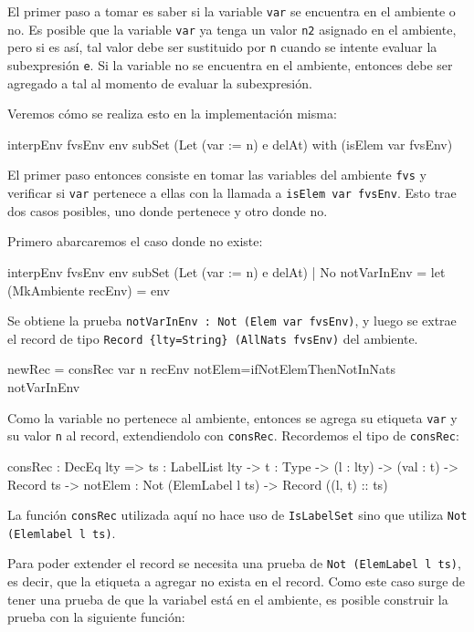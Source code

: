 El primer paso a tomar es saber si la variable \texttt{var} se encuentra en el ambiente o no. Es posible que la variable \texttt{var} ya tenga un valor \texttt{n2} asignado en el ambiente, pero si es así, tal valor debe ser sustituido por \texttt{n} cuando se intente evaluar la subexpresión \texttt{e}. Si la variable no se encuentra en el ambiente, entonces debe ser agregado a tal al momento de evaluar la subexpresión.

Veremos cómo se realiza esto en la implementación misma:

\begin{code}
interpEnv {fvsEnv} env subSet (Let (var := n) e delAt)
    with (isElem var fvsEnv)
\end{code}

El primer paso entonces consiste en tomar las variables del ambiente \texttt{fvs} y verificar si \texttt{var} pertenece a ellas con la llamada a \texttt{isElem var fvsEnv}. Esto trae dos casos posibles, uno donde pertenece y otro donde no.

Primero abarcaremos el caso donde no existe:

\begin{code}
interpEnv {fvsEnv} env subSet (Let (var := n) e delAt)
  | No notVarInEnv =
  let (MkAmbiente recEnv) = env
\end{code}

Se obtiene la prueba \texttt{notVarInEnv : Not (Elem var fvsEnv)}, y luego se extrae el record de tipo \texttt{Record \{lty=String\} (AllNats fvsEnv)} del ambiente.

\begin{code}
newRec = consRec var n recEnv
  {notElem=ifNotElemThenNotInNats notVarInEnv}
\end{code}

Como la variable no pertenece al ambiente, entonces se agrega su etiqueta \texttt{var} y su valor \texttt{n} al record, extendiendolo con \texttt{consRec}. Recordemos el tipo de \texttt{consRec}:

\begin{code}
consRec : DecEq lty => {ts : LabelList lty} -> {t : Type} ->
  (l : lty) -> (val : t) -> Record ts ->
  {notElem : Not (ElemLabel l ts)} -> Record ((l, t) :: ts)
\end{code}

La función \texttt{consRec} utilizada aquí no hace uso de \texttt{IsLabelSet} sino que utiliza \texttt{Not (Elemlabel l ts)}.

Para poder extender el record se necesita una prueba de \texttt{Not (ElemLabel l ts)}, es decir, que la etiqueta a agregar no exista en el record. Como este caso surge de tener una prueba de que la variabel está en el ambiente, es posible construir la prueba con la siguiente función:

